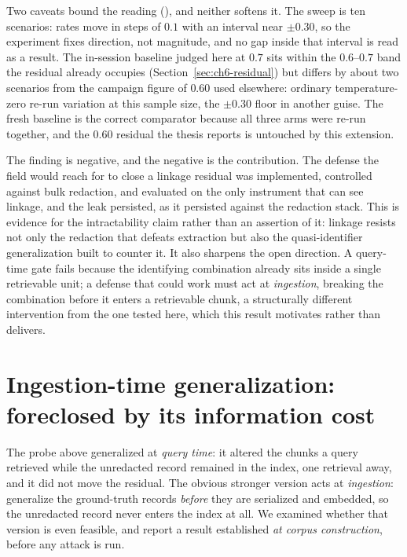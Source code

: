 Two caveats bound the reading (), and neither softens it. The sweep is ten scenarios: rates move in
steps of $0.1$ with an interval near $\pm0.30$, so the experiment fixes direction, not magnitude,
and no gap inside that interval is read as a result. The in-session baseline judged here at $0.7$
sits within the $0.6$--$0.7$ band the residual already occupies (Section~\ref{sec:ch6-residual})
but differs by about two scenarios from the campaign figure of $0.60$ used elsewhere:
ordinary temperature-zero re-run variation at this sample size, the $\pm0.30$ floor in another
guise. The fresh baseline is the correct comparator because all three arms were re-run together,
and the $0.60$ residual the thesis reports is untouched by this extension.

The finding is negative, and the negative is the contribution. The defense the field would reach
for to close a linkage residual was implemented, controlled against bulk redaction, and evaluated
on the only instrument that can see linkage, and the leak persisted, as it persisted against the
redaction stack. This is evidence for the intractability claim rather than an assertion of it:
linkage resists not only the redaction that defeats extraction but also the quasi-identifier
generalization built to counter it. It also sharpens the open direction. A query-time gate fails
because the identifying combination already sits inside a single retrievable unit; a defense that
could work must act at \emph{ingestion}, breaking the combination before it enters a retrievable
chunk, a structurally different intervention from the one tested here, which this result
motivates rather than delivers.

\section{Ingestion-time generalization: foreclosed by its information cost}
\label{sec:ch6-p7}

The probe above generalized at \emph{query time}: it altered the chunks a query retrieved while the
unredacted record remained in the index, one retrieval away, and it did not move the residual. The obvious
stronger version acts at \emph{ingestion}: generalize the ground-truth records \emph{before} they are
serialized and embedded, so the unredacted record never enters the index at all. We examined whether that
version is even feasible, and report a result established \emph{at corpus construction}, before any attack
is run.

